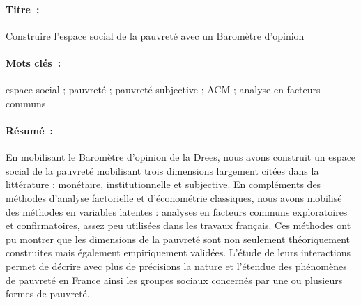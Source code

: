 \documentclass[12pt,a4paper]{reedthesis}
\begin{document}
\lhead{}
\rhead{}
\rfoot{}
\cfoot{}
\lfoot{}

\noindent
\begin{mdframed}[linecolor=Prune,linewidth=1]
\vspace{-.25cm}
\paragraph*{Titre~:} Construire l'espace social de la pauvreté avec un Baromètre d'opinion
\begin{small}
\paragraph*{Mots clés~:} espace social ; pauvreté ; pauvreté subjective ; ACM ; analyse en facteurs communs

\paragraph*{Résumé~:} En mobilisant le Baromètre d'opinion de la Drees, nous avons construit un espace social de la pauvreté mobilisant trois dimensions largement citées dans la littérature : monétaire, institutionnelle et subjective. En compléments des méthodes d'analyse factorielle et d'économétrie classiques, nous avons mobilisé des méthodes en variables latentes : analyses en facteurs communs exploratoires et confirmatoires, assez peu utilisées dans les travaux français. Ces méthodes ont pu montrer que les dimensions de la pauvreté sont non seulement théoriquement construites mais également empiriquement validées. L'étude de leurs interactions permet de décrire avec plus de précisions la nature et l'étendue des phénomènes de pauvreté en France ainsi les groupes sociaux concernés par une ou plusieurs formes de pauvreté.
\end{small}
\end{mdframed}
\end{document}
